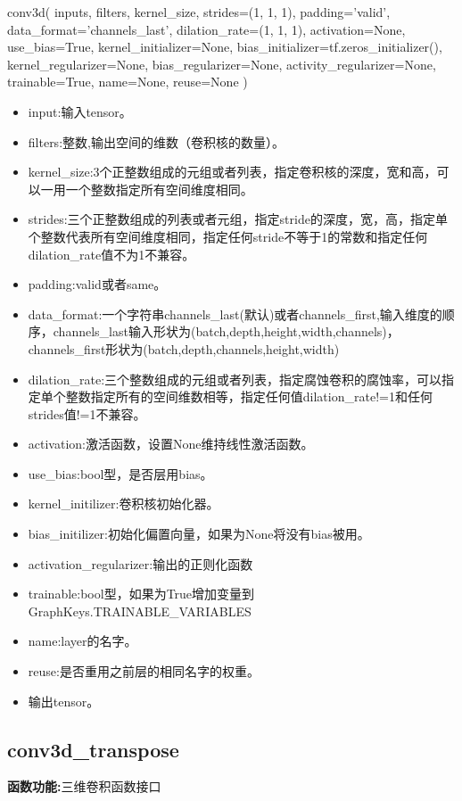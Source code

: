 \begin{python}
conv3d(
    inputs,
    filters,
    kernel_size,
    strides=(1, 1, 1),
    padding='valid',
    data_format='channels_last',
    dilation_rate=(1, 1, 1),
    activation=None,
    use_bias=True,
    kernel_initializer=None,
    bias_initializer=tf.zeros_initializer(),
    kernel_regularizer=None,
    bias_regularizer=None,
    activity_regularizer=None,
    trainable=True,
    name=None,
    reuse=None
)
\end{python}
\begin{itemize}
	\item input:输入tensor。
	\item filters:整数,输出空间的维数（卷积核的数量）。
	\item kernel\_size:3个正整数组成的元组或者列表，指定卷积核的深度，宽和高，可以一用一个整数指定所有空间维度相同。
	\item strides:三个正整数组成的列表或者元组，指定stride的深度，宽，高，指定单个整数代表所有空间维度相同，指定任何stride不等于1的常数和指定任何dilation\_rate值不为1不兼容。
	\item padding:valid或者same。
	\item data\_format:一个字符串channels\_last(默认)或者channels\_first,输入维度的顺序，channels\_last输入形状为(batch,depth,height,width,channels)，channels\_first形状为(batch,depth,channels,height,width)
	\item dilation\_rate:三个整数组成的元组或者列表，指定腐蚀卷积的腐蚀率，可以指定单个整数指定所有的空间维数相等，指定任何值dilation\_rate!=1和任何strides值!=1不兼容。
	\item activation:激活函数，设置None维持线性激活函数。
	\item use\_bias:bool型，是否层用bias。
	\item kernel\_initilizer:卷积核初始化器。
	\item bias\_initilizer:初始化偏置向量，如果为None将没有bias被用。
	\item activation\_regularizer:输出的正则化函数
	\item trainable:bool型，如果为True增加变量到GraphKeys.TRAINABLE\_VARIABLES
	\item name:layer的名字。
	\item reuse:是否重用之前层的相同名字的权重。
	\item 输出tensor。
\end{itemize}
\subsection{conv3d\_transpose}
\textbf{函数功能:}三维卷积函数接口

